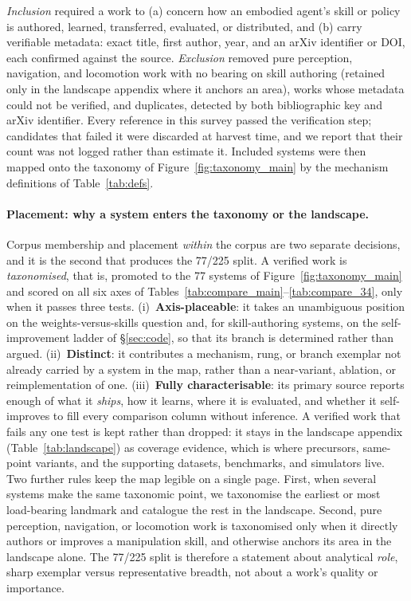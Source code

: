 \emph{Inclusion} required a work to (a) concern how an embodied agent's skill or policy is
authored, learned, transferred, evaluated, or distributed, and (b) carry verifiable metadata:
exact title, first author, year, and an arXiv identifier or DOI, each confirmed against the
source. \emph{Exclusion} removed pure perception, navigation, and locomotion work with no
bearing on skill authoring (retained only in the landscape appendix where it anchors an area),
works whose metadata could not be verified, and duplicates, detected by both bibliographic key
and arXiv identifier. Every reference in this survey passed the verification step; candidates
that failed it were discarded at harvest time, and we report that their count was not logged
rather than estimate it. Included systems were then mapped onto the taxonomy of
Figure~\ref{fig:taxonomy_main} by the mechanism definitions of Table~\ref{tab:defs}.

\paragraph{Placement: why a system enters the taxonomy or the landscape.}
Corpus membership and placement \emph{within} the corpus are two separate decisions, and it is the
second that produces the 77/225 split. A verified work is \emph{taxonomised}, that is, promoted to
the 77 systems of Figure~\ref{fig:taxonomy_main} and scored on all six axes of
Tables~\ref{tab:compare_main}--\ref{tab:compare_34}, only when it passes three tests.
(i)~\textbf{Axis-placeable}: it takes an unambiguous position on the weights-versus-skills question
and, for skill-authoring systems, on the self-improvement ladder of \S\ref{sec:code}, so that its
branch is determined rather than argued. (ii)~\textbf{Distinct}: it contributes a mechanism, rung,
or branch exemplar not already carried by a system in the map, rather than a near-variant, ablation,
or reimplementation of one. (iii)~\textbf{Fully characterisable}: its primary source reports enough
of what it \emph{ships}, how it learns, where it is evaluated, and whether it self-improves to fill
every comparison column without inference. A verified work that fails any one test is kept rather
than dropped: it stays in the landscape appendix (Table~\ref{tab:landscape}) as coverage evidence,
which is where precursors, same-point variants, and the supporting datasets, benchmarks, and
simulators live. Two further rules keep the map legible on a single page. First, when several
systems make the same taxonomic point, we taxonomise the earliest or most load-bearing landmark and
catalogue the rest in the landscape. Second, pure perception, navigation, or locomotion work is
taxonomised only when it directly authors or improves a manipulation skill, and otherwise anchors
its area in the landscape alone. The 77/225 split is therefore a statement about analytical
\emph{role}, sharp exemplar versus representative breadth, not about a work's quality or importance.

